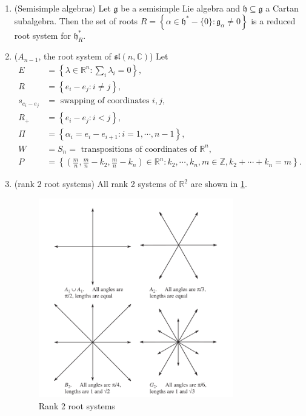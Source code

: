 \documentclass{report}
\begin{document}
\begin{example}
    \begin{enumerate}[label = (\roman*)]
        \item (Semisimple algebras) Let $\mathfrak g$ be a semisimple Lie algebra and $\mathfrak h \subseteq \mathfrak g$ a Cartan subalgebra.
        Then the set of roots $R = \left\{ \alpha \in \mathfrak h^* - \{0\} : \mathfrak g_\alpha \neq 0 \right\}$ is a reduced root system for $\mathfrak h_{R}^*$.
        \item ($A_{n - 1}$, the root system of $\mathfrak{sl}(n, \mathbb C)$) Let
        \begin{align*}
            E &= \left\{\lambda \in \mathbb R^n: \sum_{i} \lambda_i = 0\right\},\\
            R &= \left\{e_i - e_j: i\neq j\right\},\\
            s_{e_i - e_j} &= \text{ swapping of coordinates } i, j,\\
            R_+ &= \left\{e_i - e_j: i < j\right\},\\
            \Pi &= \left\{\alpha_i = e_i - e_{i+1}: i = 1, \cdots, n-1\right\},\\
            W &= S_n = \text{ transpositions of coordinates of } \mathbb R^n,\\
            P &= \left\{\left( \frac{m}{n}, \frac{m}{n} - k_2, \frac{m}{n} - k_n \right) \in \mathbb R^n :k_2, \cdots, k_n, m \in \mathbb Z, k_2 + \cdots + k_n = m\right\}.
        \end{align*}
        \item (rank $2$ root systems) All rank 2 systems of $\mathbb R^2$ are shown in \cref{fig:rank_two_systems}.
        \begin{figure}[h]
            \centering
            \includegraphics[width=0.8\textwidth]{rank two root systems.png}
            \caption{Rank 2 root systems}
            \label{fig:rank_two_systems}
        \end{figure}
        
    \end{enumerate}
\end{example}
\end{document}
